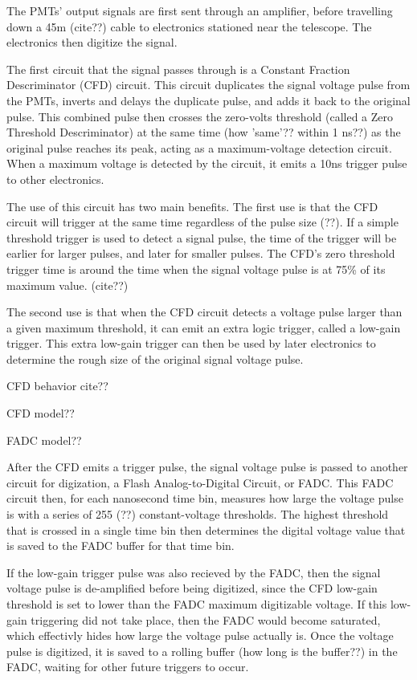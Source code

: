 The PMTs' output signals are first sent through an amplifier, before travelling down a \nicetilde45m (cite??) cable to electronics stationed near the telescope.
The electronics then digitize the signal.

The first circuit that the signal passes through is a Constant Fraction Descriminator (CFD) circuit.
This circuit duplicates the signal voltage pulse from the PMTs, inverts and delays the duplicate pulse, and adds it back to the original pulse.
This combined pulse then crosses the zero-volts threshold (called a Zero Threshold Descriminator) at the same time (how 'same'?? within 1 ns??) as the original pulse reaches its peak, acting as a maximum-voltage detection circuit.
When a maximum voltage is detected by the circuit, it emits a 10ns trigger pulse to other electronics.

The use of this circuit has two main benefits.
The first use is that the CFD circuit will trigger at the same time regardless of the pulse size (??).
If a simple threshold trigger is used to detect a signal pulse, the time of the trigger will be earlier for larger pulses, and later for smaller pulses.
The CFD's zero threshold trigger time is around the time when the signal voltage pulse is at 75\% of its maximum value. (cite??)

The second use is that when the CFD circuit detects a voltage pulse larger than a given maximum threshold, it can emit an extra logic trigger, called a low-gain trigger.
This extra low-gain trigger can then be used by later electronics to determine the rough size of the original signal voltage pulse.

CFD behavior cite??

CFD model??

FADC model??

After the CFD emits a trigger pulse, the signal voltage pulse is passed to another circuit for digization, a Flash Analog-to-Digital Circuit, or FADC.
This FADC circuit then, for each nanosecond time bin, measures how large the voltage pulse is with a series of 255 (??) constant-voltage thresholds.
The highest threshold that is crossed in a single time bin then determines the digital voltage value that is saved to the FADC buffer for that time bin.

If the low-gain trigger pulse was also recieved by the FADC, then the signal voltage pulse is de-amplified before being digitized, since the CFD low-gain threshold is set to lower than the FADC maximum digitizable voltage.
If this low-gain triggering did not take place, then the FADC would become saturated, which effectivly hides how large the voltage pulse actually is.
Once the voltage pulse is digitized, it is saved to a rolling buffer (how long is the buffer??) in the FADC, waiting for other future triggers to occur.

